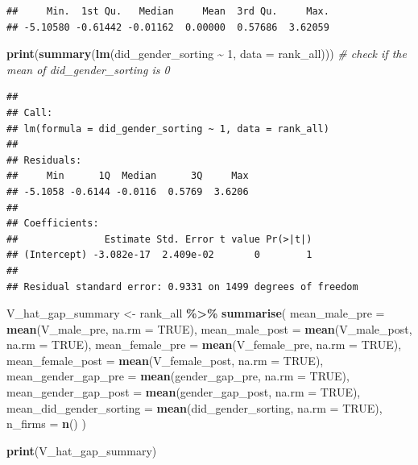 \documentclass[
]{article}
\newenvironment{Shaded}{\begin{snugshade}}{\end{snugshade}}
\newcommand{\AttributeTok}[1]{\textcolor[rgb]{0.13,0.29,0.53}{#1}}
\newcommand{\CommentTok}[1]{\textcolor[rgb]{0.56,0.35,0.01}{\textit{#1}}}
\newcommand{\ConstantTok}[1]{\textcolor[rgb]{0.56,0.35,0.01}{#1}}
\newcommand{\DecValTok}[1]{\textcolor[rgb]{0.00,0.00,0.81}{#1}}
\newcommand{\FunctionTok}[1]{\textcolor[rgb]{0.13,0.29,0.53}{\textbf{#1}}}
\newcommand{\NormalTok}[1]{#1}
\newcommand{\OtherTok}[1]{\textcolor[rgb]{0.56,0.35,0.01}{#1}}
\newcommand{\SpecialCharTok}[1]{\textcolor[rgb]{0.81,0.36,0.00}{\textbf{#1}}}
\begin{document}
\begin{verbatim}
##     Min.  1st Qu.   Median     Mean  3rd Qu.     Max. 
## -5.10580 -0.61442 -0.01162  0.00000  0.57686  3.62059
\end{verbatim}

\begin{Shaded}
\begin{Highlighting}[]
\FunctionTok{print}\NormalTok{(}\FunctionTok{summary}\NormalTok{(}\FunctionTok{lm}\NormalTok{(did\_gender\_sorting }\SpecialCharTok{\textasciitilde{}} \DecValTok{1}\NormalTok{, }\AttributeTok{data =}\NormalTok{ rank\_all))) }\CommentTok{\# check if the mean of did\_gender\_sorting is 0}
\end{Highlighting}
\end{Shaded}

\begin{verbatim}
## 
## Call:
## lm(formula = did_gender_sorting ~ 1, data = rank_all)
## 
## Residuals:
##     Min      1Q  Median      3Q     Max 
## -5.1058 -0.6144 -0.0116  0.5769  3.6206 
## 
## Coefficients:
##               Estimate Std. Error t value Pr(>|t|)
## (Intercept) -3.082e-17  2.409e-02       0        1
## 
## Residual standard error: 0.9331 on 1499 degrees of freedom
\end{verbatim}

\begin{Shaded}
\begin{Highlighting}[]
\NormalTok{V\_hat\_gap\_summary }\OtherTok{\textless{}{-}}\NormalTok{ rank\_all }\SpecialCharTok{\%\textgreater{}\%}
    \FunctionTok{summarise}\NormalTok{(}
        \AttributeTok{mean\_male\_pre =} \FunctionTok{mean}\NormalTok{(V\_male\_pre, }\AttributeTok{na.rm =} \ConstantTok{TRUE}\NormalTok{),}
        \AttributeTok{mean\_male\_post =} \FunctionTok{mean}\NormalTok{(V\_male\_post, }\AttributeTok{na.rm =} \ConstantTok{TRUE}\NormalTok{),}
        \AttributeTok{mean\_female\_pre =} \FunctionTok{mean}\NormalTok{(V\_female\_pre, }\AttributeTok{na.rm =} \ConstantTok{TRUE}\NormalTok{),}
        \AttributeTok{mean\_female\_post =} \FunctionTok{mean}\NormalTok{(V\_female\_post, }\AttributeTok{na.rm =} \ConstantTok{TRUE}\NormalTok{),}
        \AttributeTok{mean\_gender\_gap\_pre =} \FunctionTok{mean}\NormalTok{(gender\_gap\_pre, }\AttributeTok{na.rm =} \ConstantTok{TRUE}\NormalTok{),}
        \AttributeTok{mean\_gender\_gap\_post =} \FunctionTok{mean}\NormalTok{(gender\_gap\_post, }\AttributeTok{na.rm =} \ConstantTok{TRUE}\NormalTok{),}
        \AttributeTok{mean\_did\_gender\_sorting =} \FunctionTok{mean}\NormalTok{(did\_gender\_sorting, }\AttributeTok{na.rm =} \ConstantTok{TRUE}\NormalTok{),}
        \AttributeTok{n\_firms =} \FunctionTok{n}\NormalTok{()}
\NormalTok{    )}

\FunctionTok{print}\NormalTok{(V\_hat\_gap\_summary)}
\end{Highlighting}
\end{Shaded}
\end{document}
